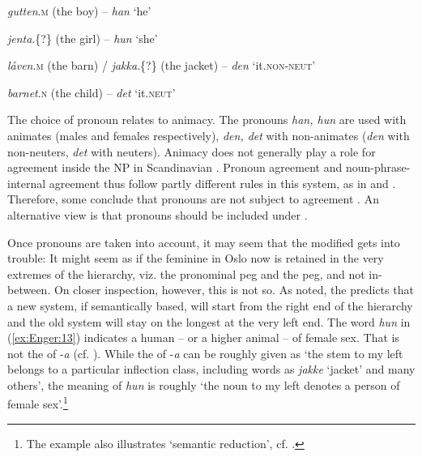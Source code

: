 \documentclass[output=paper]{langsci/langscibook}
\begin{document}
\begin{exe}
\begin{xlist}
\begin{xlist}
\ea\label{ex:Enger:a} \emph{gutten}.\textsc{m} (the boy) -- \emph{han} `he'

\ex\label{ex:Enger:b} \emph{jenta}.\{?\} (the girl) -- \emph{hun} `she'

\ex \emph{låven}.\textsc{m} (the barn) / \emph{jakka}.\textsc{\{?\}} (the jacket) -- \emph{den}
`it.\textsc{non-neut}'

\ex \emph{barnet}.\textsc{n} (the child) -- \emph{det} `it.\textsc{neut}'

\z
\z

The choice of pronoun relates to animacy. The pronouns \emph{han, hun}
are used with animates (males and females respectively), \emph{den, det}
with non-animates (\emph{den} with non-neuters, \emph{det} with neuters). Animacy does not generally play a role for  agreement
inside the NP in Scandinavian %
\citep[though cf.][286--289]{Enger13}%
%
. Pronoun
agreement and noun-phrase-internal agreement thus follow partly
different rules in this system, as in  and . Therefore,
some conclude that pronouns are not subject to  agreement %
\citep[e.g.][]{Josefsson09,Josefsson14b}%
%
. An alternative view is that pronouns should be
included under  %
\citep[e.g.][]{Corbett2006,Enger13,Dolberg14,Haugen14,VanEpps17}%
%
.

Once pronouns are taken into account, it may seem that the modified
 gets into trouble: It might seem as if the feminine
in Oslo now is retained in the very extremes of the hierarchy, viz. the
pronominal peg and the  peg, and not in-between. On closer
inspection, however, this is not so. As noted, the 
predicts that a new  system, if semantically based, will start
from the right end of the hierarchy and the old system will stay on the
longest at the very left end. The word \emph{hun} in (\ref{ex:Enger:13}) indicates a
human -- or a higher animal -- of female sex. That is not the
 of -\emph{a} (cf. ). While the
  of -\emph{a} can be roughly given as `the
stem to my left belongs to a particular inflection class, including
words as \emph{jakke} `jacket' and many others', the meaning of
\emph{hun} is roughly `the noun to my left denotes a person of female
sex'.\footnote{The example also illustrates `semantic reduction', cf.
  .}


\end{xlist}
\end{xlist}
\end{exe}
\end{document}
